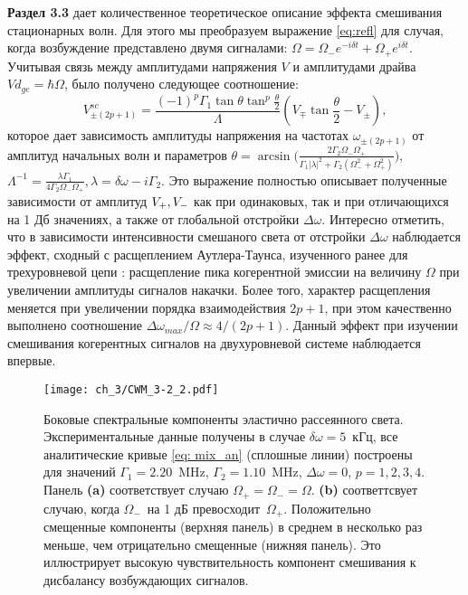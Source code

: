 \textbf{Раздел 3.3} дает количественное теоретическое описание эффекта смешивания стационарных волн. Для этого мы преобразуем выражение \eqref{eq:refl} для случая, когда возбуждение представлено двумя сигналами: $\Omega=\Omega_-e^{-i\delta t}+\Omega_+ e^{i\delta t}$. Учитывая связь между амплитудами напряжения $V$ и амплитудами драйва $Vd_{ge}=\hbar\Omega$, было получено следующее соотношение:
\begin{equation}
V^{sc}_{\pm(2p+1)}=\frac{(-1)^p\Gamma_1\tan\theta\tan^p\frac{\theta}{2}}{\Lambda}(V_\mp \tan\frac{\theta}{2} - V_\pm),
\label{eq: mix_an}
\end{equation}
которое дает зависимость амплитуды напряжения на частотах $\omega_{\pm(2p+1)}$ от амплитуд начальных волн и  параметров $\theta = \arcsin\Big(\frac{2\Gamma_2 \Omega_- \Omega_+}{\Gamma_1 |\lambda|^2 + \Gamma_2(\Omega_-^2 + \Omega_+^2)}\Big)$, $\Lambda^{-1} = \frac{\lambda\Gamma_1}{4\Gamma_2 \Omega_-\Omega_+}, \lambda = \delta\omega-i\Gamma_2$. Это выражение полностью описывает полученные зависимости от амплитуд $V_+,\space V_-$ как при одинаковых, так и при отличающихся на 1 Дб значениях, а также от глобальной отстройки $\Delta\omega$. Интересно отметить, что в зависимости интенсивности смешаного света от отстройки $\Delta\omega$ наблюдается эффект, сходный с расщеплением Аутлера-Таунса, изученного ранее для трехуровневой цепи \cite{ATS_3LS}: расщепление пика когерентной эмиссии на величину $\Omega$ при увеличении амплитуды сигналов накачки. Более того, характер расщепления меняется при увеличении порядка взаимодействия $2p+1$, при этом качественно выполнено соотношение $\Delta\omega_{max}/\Omega \approx 4/(2p+1)$. Данный эффект при изучении смешивания когерентных сигналов на двухуровневой системе наблюдается впервые.  
\begin{figure}[htb]\center
	\texttt{[image: ch\_3/CWM\_3-2\_2.pdf]}
	\caption{ Боковые спектральные компоненты эластично рассеянного света. Экспериментальные данные получены в случае  $\delta\omega=5$~кГц, все аналитические кривые \eqref{eq: mix_an} (сплошные линии) построены для значений $\Gamma_1 = 2.20$~MHz, $\Gamma_2=1.10$~MHz, $\Delta\omega=0$, $p=1,2,3,4$. Панель \textbf{(a)} соответствует случаю $\Omega_+=\Omega_- =\Omega$. \textbf{(b)} соответтсвует случаю, когда $\Omega_-$~на 1 дБ превосходит~$\Omega_+ $. Положительно смещенные компоненты (верхняя панель) в среднем в несколько раз меньше, чем отрицательно смещенные (нижняя панель). Это иллюстрирует высокую чувствительность компонент смешивания к дисбалансу возбуждающих сигналов.}
	\label{fig: fwm_fits}
\end{figure}

